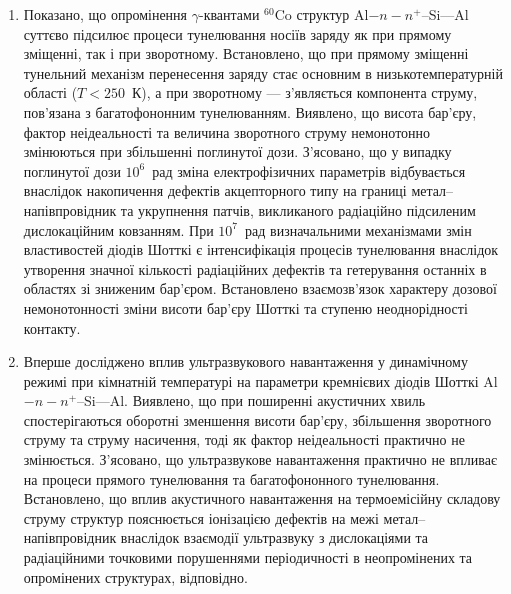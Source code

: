\begin{enumerate}[leftmargin=0cm,itemindent=3em]
\item 
     Показано, що опромінення $\gamma$-квантами $^{60}$Co структур Al$-n-n^+$--Si---Al суттєво підсилює процеси тунелювання носіїв заряду як при прямому зміщенні, так і при зворотному.
     Встановлено, що при прямому зміщенні тунельний механізм перенесення заряду стає основним в низькотемпературній області ($T<250$~К),
а при зворотному --- з'являється компонента струму, пов'язана з багатофононним тунелюванням.
 Виявлено, що висота бар'єру, фактор неідеальності та величина зворотного струму немонотонно змінюються при збільшенні поглинутої дози.
З'ясовано, що у випадку поглинутої дози $10^6$~рад зміна
електрофізичних
параметрів відбувається внаслідок накопичення дефектів акцепторного типу на границі метал--напівпровідник та укрупнення патчів, викликаного радіаційно підсиленим дислокаційним ковзанням.
При $10^7$~рад
визначальними механізмами змін властивостей діодів Шотткі є інтенсифікація процесів тунелювання внаслідок утворення значної кількості радіаційних дефектів та гетерування останніх в областях зі зниженим бар'єром.
Встановлено взаємозв'язок характеру дозової немонотонності зміни висоти бар'єру Шотткі та ступеню неоднорідності контакту.


\item
Вперше досліджено вплив ультразвукового навантаження у динамічному режимі при кімнатній температурі на параметри кремнієвих діодів Шотткі Al$-n-n^+$--Si---Al.
Виявлено, що при поширенні акустичних хвиль спостерігаються оборотні зменшення висоти бар'єру,
збільшення зворотного струму та струму насичення, тоді як фактор неідеальності практично не змінюється.
З'ясовано, що ультразвукове навантаження практично не впливає на процеси прямого тунелювання та багатофононного тунелювання.
Встановлено, що вплив акустичного навантаження на термоемісійну складову струму структур пояснюється іонізацією дефектів на межі метал--напівпровідник
  внаслідок взаємодії ультразвуку з дислокаціями та радіаційними точковими порушеннями періодичності в неопромінених та опромінених структурах, відповідно.


\end{enumerate}
